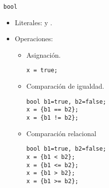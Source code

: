 \begin{frame}[t,fragile]{\texttt{bool}}
\begin{itemize}
  \item Literales:  y .
  \item Operaciones:
    \begin{itemize}
      \item Asignación.
\begin{lstlisting}
x = true;
\end{lstlisting}
      \item Comparación de igualdad.
\begin{lstlisting}
bool b1=true, b2=false;
x = {b1 == b2};
x = {b1 != b2};
\end{lstlisting}
      \item Comparación relacional
\begin{lstlisting}
bool b1=true, b2=false;
x = {b1 < b2};
x = {b1 <= b2};
x = {b1 > b2};
x = {b1 >= b2};
\end{lstlisting}
    \end{itemize}
\end{itemize}
\end{frame}

